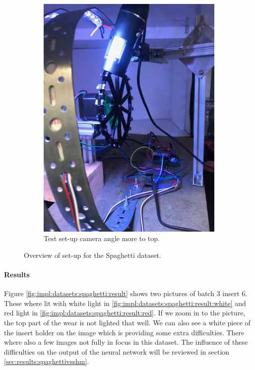 \begin{figure}[hbtp]
\begin{subfigure}{0.4\textwidth}
		\includegraphics[width=\linewidth, keepaspectratio=true,angle=270]{./fig/Vision/Dataset/automated_datasets/2_created_datasets/2_Spaghetti_dataset/IMG_9296.jpeg}
		\caption{Test set-up camera angle more to top.}
		\label{fig:impl:sd:setup:top}
	\end{subfigure}
	\hspace*{\fill}
	\caption{Overview of set-up for the Spaghetti dataset.}
\end{figure}

\begin{figure}[hbtp]
\centering
	
\end{figure}



\paragraph{Results}

Figure \ref{fig:impl:datasets:spaghetti:result} shows two pictures of batch 3 insert 6. These where lit with white light in \ref{fig:impl:datasets:spaghetti:result:white} and red light in \ref{fig:impl:datasets:spaghetti:result:red}. If we zoom in to the picture, the top part of the wear is not lighted that well. We can also see a white piece of the insert holder on the image which is providing some extra difficulties. There where also a few images not fully in focus in this dataset. The influence of these difficulties on the output of the neural network will be reviewed in section \ref{sec:results:spaghettivsshm}.

